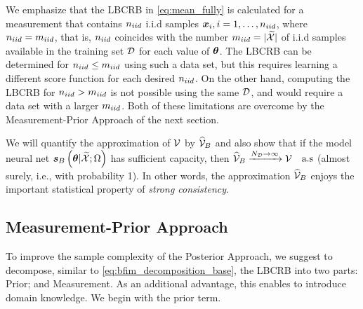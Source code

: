 {We emphasize that the LBCRB in \eqref{eq:mean_fully} is calculated  {for a measurement that contains  $n_{iid}$ i.i.d samples $\bm{x}_i, i=1, \ldots, n_{iid}$, where $n_{iid}= m_{iid}$, that is, $n_{iid}$ coincides with the number $m_{iid} = |\widetilde{\mathcal{X}}|$ of i.i.d samples available in the training set $\mathcal{D}$ for each  value of $\bm{\theta}$.  %
}
The LBCRB can be determined for $n_{iid}\leq m_{iid}$ {using such a data set,}  but this requires learning a different score function for each desired $n_{iid}$. {On the other hand, computing 
the LBCRB for $n_{iid} > m_{iid}$ is not possible using the same $\mathcal{D}$, and would require a data set with a larger $m_{iid}$.
 Both of these limitations are overcome by the Measurement-Prior Approach of the next section.
}

We %
will {quantify the approximation of $\mathcal{V}$ by $\widehat{\mathcal{V}}_{B}$ and also}
show that if  {the model neural net $\bm{s}_{B}\left(\bm{\theta}|\widetilde{\mathcal{X}};\Omega\right)$} has sufficient capacity, then
{
$
    \lbcrbbs %
    \xrightarrow{\nds\rightarrow \infty} \bcrb \quad\text{%
    {a.s}} 
$
(almost surely, i.e., with probability 1). In other words, the approximation $\widehat{\mathcal{V}}_{B}$ enjoys the important statistical 
 property of \emph{strong consistency}.
}



\subsection{Measurement-Prior Approach}
\label{subsec:MP}
To improve the sample complexity of the Posterior Approach, we suggest to decompose, {similar to \eqref{eq:bfim_decomposition_base},} the LBCRB into two parts: Prior; and Measurement. As an additional advantage, this enables to introduce domain knowledge. We begin with the prior term.

}

